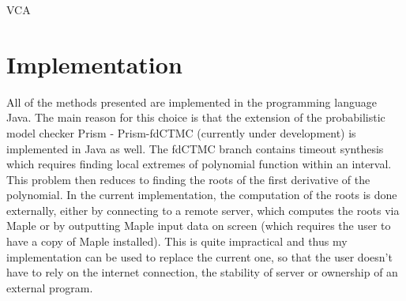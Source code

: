 \documentclass[
  digital, %
  notable,   %
  nolof,     %
  nolot,     %
	final, %
]{fithesis3}
\begin{document}
\begin{algorithm}
  \caption{VCA
    \label{alg:vca}}
  \begin{algorithmic}[1]
    \Statex
				\State\Return{$\emptyset$}
			\EndIf
				\State{}
			\EndIf
				\State{}
			\EndIf
				\State{}
			\Else
				\State{}
			\EndIf
    \EndFunction
  \end{algorithmic}
\end{algorithm}

\chapter{Implementation}
All of the methods presented are implemented in the programming language Java. The main reason for this choice is that the extension of the probabilistic model checker Prism \parencite{KNP11} - Prism-fdCTMC (currently under development) is implemented in Java as well. The fdCTMC branch contains timeout synthesis \parencite{DBLP:conf/mascots/KorenciakKR16} which requires finding local extremes of polynomial function within an interval. This problem then reduces to finding the roots of the first derivative of the polynomial. In the current implementation, the computation of the roots is done externally, either by connecting to a remote server, which computes the roots via Maple or by outputting Maple input data on screen (which requires the user to have a copy of Maple installed). This is quite impractical and thus my implementation can be used to replace the current one, so that the user doesn't have to rely on the internet connection, the stability of server or ownership of an external program.
\end{document}
